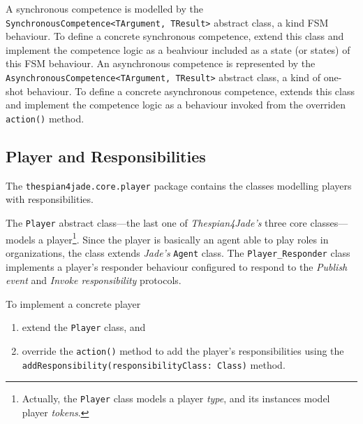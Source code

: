 A synchronous competence is modelled by the \texttt{SynchronousCompetence<TArgument, TResult>} abstract class, a kind FSM behaviour.
To define a concrete synchronous competence, extend this class and implement the competence logic as a beahviour included as a state (or states) of this FSM behaviour.
An asynchronous competence is represented by the \texttt{AsynchronousCompetence<TArgument, TResult>} abstract class, a kind of one-shot behaviour.
To define a concrete asynchronous competence, extends this class and implement the competence logic as a behaviour invoked from the overriden \texttt{action()} method.

\subsection{Player and Responsibilities}

The \texttt{thespian4jade.core.player} package contains the classes modelling players with responsibilities.

The \texttt{Player} abstract class---the last one of \textit{Thespian4Jade's} three core classes---models a player\footnote{Actually, the \texttt{Player} class models a player \textit{type}, and its instances model player \textit{tokens}.}.
Since the player is basically an agent able to play roles in organizations, the class extends \textit{Jade's} \texttt{Agent} class.
The \texttt{Player\_Responder} class implements a player's responder behaviour configured to respond to the \textit{Publish event} and \textit{Invoke responsibility} protocols.

To implement a concrete player
\begin{enumerate}
	\item extend the \texttt{Player} class, and
	\item override the \texttt{action()} method to add the player's responsibilities using the \texttt{addResponsibility(responsibilityClass: Class)} method.	
\end{enumerate}


